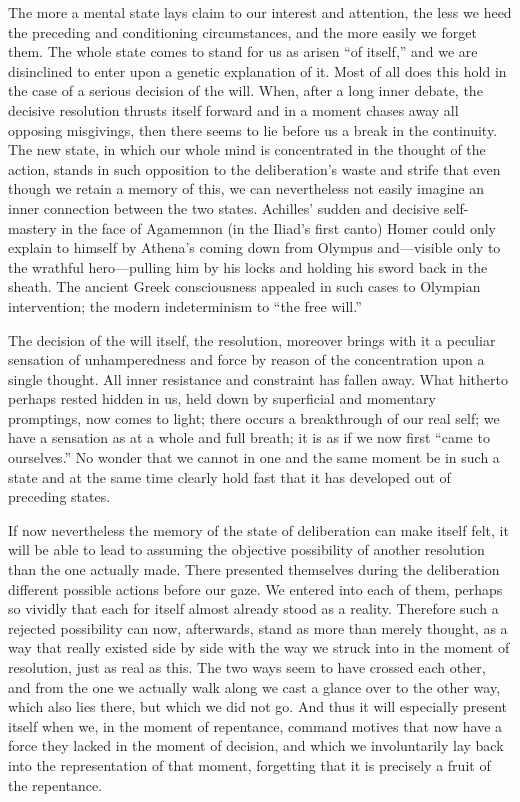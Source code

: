 \documentclass[12pt,a4paper]{book}
\newcommand{\opage}[1]{\marginnote{\footnotesize\textit{[#1]}}}
\begin{document}
The more a mental state lays claim to our interest and attention, the less we heed
the preceding and conditioning circumstances, and the more easily we forget them. The
whole state comes to stand for us as arisen ``of itself,'' and we are disinclined to
enter upon a genetic explanation of it. Most of all does this hold in the case of a
serious decision of the will. When, after a long inner debate, the decisive
resolution thrusts itself forward and in a moment chases away all opposing
misgivings, then there seems to lie before us a break in the continuity. The new
state, in which our whole mind is concentrated in the thought of the action, stands
in such opposition to the deliberation's waste and strife that even though we retain
a memory of this, we can nevertheless not easily imagine an inner connection \opage{294}between
the two states. Achilles' sudden and decisive self-mastery in the face of Agamemnon
(in the Iliad's first canto) Homer could only explain to himself by Athena's coming
down from Olympus and---visible only to the wrathful hero---pulling him by his locks
and holding his sword back in the sheath. The ancient Greek consciousness appealed in
such cases to Olympian intervention; the modern indeterminism to ``the free will.''

The decision of the will itself, the resolution, moreover brings with it a peculiar
sensation of unhamperedness and force by reason of the concentration upon a single
thought. All inner resistance and constraint has fallen away. What hitherto perhaps
rested hidden in us, held down by superficial and momentary promptings, now comes to
light; there occurs a breakthrough of our real self; we have a sensation as at a
whole and full breath; it is as if we now first ``came to ourselves.'' No wonder that
we cannot in one and the same moment be in such a state and at the same time clearly
hold fast that it has developed out of preceding states.

If now nevertheless the memory of the state of deliberation can make itself felt, it
will be able to lead to assuming the objective possibility of another resolution than
the one actually made. There presented themselves during the deliberation different
possible actions before our gaze. We entered into each of them, perhaps so vividly
that each for itself almost already stood as a reality. Therefore such a rejected possibility can now, afterwards, stand as more than merely thought, as a way that really existed side
by side with the way we struck into in the moment of resolution, just as real as this.
The two ways seem to have crossed each other, and from the one we actually walk along
we cast a glance over to the other way, which also lies there, but which we did not go.
And thus it will especially present itself when we, in the moment of repentance,
command motives that now have a force they lacked in the moment of decision, and which
we involuntarily lay back into the representation of that moment, forgetting that it is
precisely a fruit of the repentance.
\end{document}
